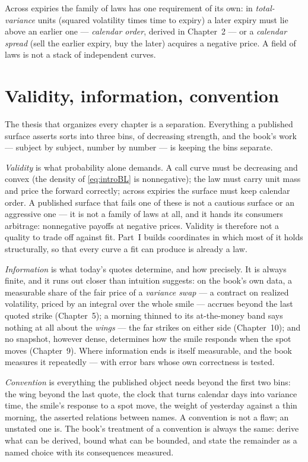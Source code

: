 Across expiries the family of laws has one requirement of its own:
in \emph{total-variance} units (squared volatility times time to
expiry) a later expiry must lie above an earlier one
--- \emph{calendar order}, derived in Chapter~2 --- or a
\emph{calendar spread} (sell the earlier expiry, buy the later)
acquires a negative price.  A field of laws is not
a stack of independent curves.

\section{Validity, information, convention}
\label{sec:introthesis}

The thesis that organizes every chapter is a separation.  Everything
a published surface asserts sorts into three bins, of decreasing
strength, and the book's work --- subject by subject, number by
number --- is keeping the bins separate.

\emph{Validity} is what probability alone demands.  A call curve must
be decreasing and convex (the density of \cref{eq:introBL} is
nonnegative); the law must carry unit mass and price the forward
correctly; across expiries the surface must keep calendar order.  A
published surface that fails one of these is not a cautious surface
or an aggressive one --- it is not a family of laws at all, and it
hands its consumers arbitrage: nonnegative payoffs at negative
prices.  Validity is therefore not a quality to trade off against
fit.  Part~I builds coordinates in which most of it holds
structurally, so that every curve a fit can produce is already a law.

\emph{Information} is what today's quotes determine, and how
precisely.  It is always finite, and it runs out closer than
intuition suggests: on the book's own data, a measurable share of
the fair price of a \emph{variance swap} --- a contract on realized
volatility, priced by an integral over the whole smile --- accrues
beyond the last quoted strike
(Chapter~5); a morning thinned to its at-the-money band says nothing
at all about the \emph{wings} --- the far strikes on either side
(Chapter~10); and no snapshot, however dense,
determines how the smile responds when the spot moves (Chapter~9).
Where information ends is itself measurable, and the book measures it
repeatedly --- with error bars whose own correctness is tested.

\emph{Convention} is everything the published object needs beyond the
first two bins: the wing beyond the last quote, the clock that turns
calendar days into variance time, the smile's response to a spot
move, the weight of yesterday against a thin morning, the asserted
relations between names.  A convention is not a flaw; an unstated one
is.  The book's treatment of a convention is always the same: derive
what can be derived, bound what can be bounded, and state the
remainder as a named choice with its consequences measured.

